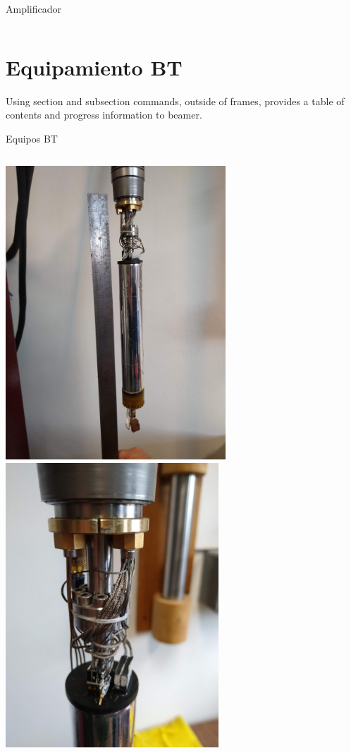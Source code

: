 \documentclass[ignorenonframetext,12pt]{beamer}
\begin{document}
\begin{frame}{Amplificador}
\begin{columns}
\begin{column}{0.45\textwidth}
								\end{column}
				\end{columns}
\end{frame}
\section{Equipamiento BT}
Using section and subsection commands, outside of frames, provides a table of contents and progress information to beamer.
\begin{frame}{Equipos BT}
				\begin{columns}
								\begin{column}{0.45\textwidth}
												\includegraphics[angle=-90,width=0.62\textwidth]{IMG_20190523_105037648} \\ 
												\includegraphics[angle=-90,width=0.6\textwidth]{IMG_20190523_105054061}

\end{column}
\end{columns}
\end{frame}
\end{document}
